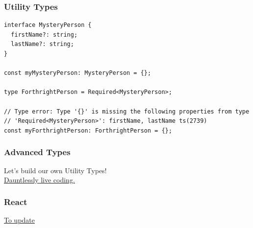 \documentclass[aspectratio=169]{beamer}
\begin{document}
\begin{frame}[fragile]
  \frametitle{Utility Types}

  \begin{verbatim}
interface MysteryPerson {
  firstName?: string;
  lastName?: string;
}

const myMysteryPerson: MysteryPerson = {};

type ForthrightPerson = Required<MysteryPerson>;

// Type error: Type '{}' is missing the following properties from type
// 'Required<MysteryPerson>': firstName, lastName ts(2739)
const myForthrightPerson: ForthrightPerson = {};
  \end{verbatim}
\end{frame}

\begin{frame}[fragile]
  \frametitle{Advanced Types}

  Let's build our own Utility Types! \\

  \href{https://bit.ly/3a5OVs1}{Dauntlessly live coding.}
\end{frame}

\begin{frame}
  \frametitle{React}

  \href{https://codesandbox.io/s/exciting-pond-9t0zh}{To update} \\
\end{frame}
\end{document}
